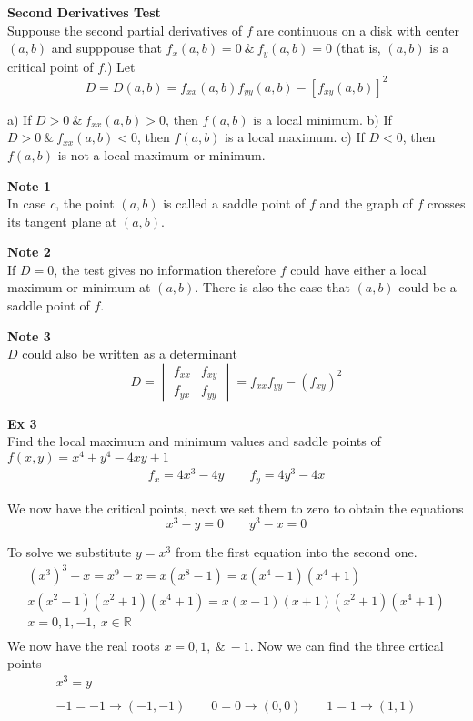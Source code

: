 \documentclass{article}
\begin{document}
    \textbf{Second Derivatives Test}\\
    Suppouse the second partial derivatives of $ f $ are continuous on a disk with center $ (a,b) $ and supppouse that $f_x(a,b)=0 ~\&~ f_y(a,b)=0$ (that is, $ (a,b) $ is a critical point of $ f $.) Let
    \[
      D=D(a,b)=f_{xx} (a,b)f_{yy} (a,b)-[f_{xy} (a,b)]^{2} 
    \]

    a) If $ D>0 ~\&~ f_{xx} (a,b)>0$, then $ f(a,b) $ is a local minimum.
    b) If $ D>0 ~\&~ f_{xx} (a,b)<0 $, then $ f(a,b) $ is a local maximum.
    c) If $ D<0 $, then $ f(a,b) $ is not a local maximum or minimum.

    \textbf{Note 1}\\
    In case $ c $, the point $ (a,b) $ is called a saddle point of $ f $ and the graph of $ f $ crosses its tangent plane at $ (a,b) $.

    \textbf{Note 2}\\
    If $ D=0 $, the test gives no information therefore $ f $ could have either a local maximum or minimum at $ (a,b) $. There is also the case that $ (a,b) $ could be a saddle point of $ f $.

    \textbf{Note 3}\\
    $ D $ could also be written as a determinant
    \[
      D = \begin{vmatrix}
       f_{xx} &f_{xy} \\
       f_{yx} &f_{yy}  
      \end{vmatrix} = f_{xx}f_{yy} -(f_{xy})^{2}
    \] 
    
    \textbf{Ex 3}\\
    Find the local maximum and minimum values and saddle points of $ f(x,y) =x^{4}+y^{4}-4xy+1  $
    \[
      \begin{gathered}
      f_x=4x^{3}-4y \qquad f_y = 4y^{3}-4x  
      \end{gathered}
    \]

    We now have the critical points, next we set them to zero to obtain the equations
    \[
      x^{3}-y=0 \qquad y^{3}-x=0  
    \]

    To solve we substitute $ y=x^{3} $ from the first equation into the second one.
    \[
      \begin{gathered}
        (x^{3})^{3} - x = x^{9}-x = x(x^{8}-1)= x(x^{4}-1)(x^{4}+1)\\
        x(x^{2}-1)(x^{2}+1)(x^{4}+1) = x(x-1)(x+1)(x^{2}+1)(x^{4}+1)\\
        x=0,1,-1,~x \in \mathbb{R}\\
      \end{gathered}
    \]
    We now have the real roots $ x=0,1, ~\&~ -1 $. Now we can find the three crtical points
    \[
      \begin{gathered}
      x^{3}=y\\
      ~\\
      -1=-1 \to (-1,-1) \qquad 0=0 \to (0,0) \qquad 1=1 \to (1,1)
      \end{gathered}
    \]
\end{document}
